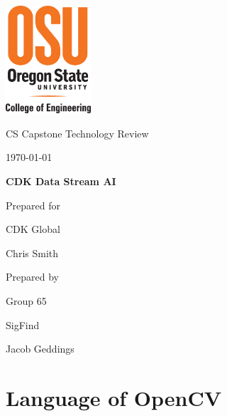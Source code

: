 \documentclass[onecolumn, draftclsnofoot,10pt, compsoc]{IEEEtran}
\def \CapstoneTeamName{		SigFind}
\def \CapstoneTeamNumber{		65}
\def \GroupMemberOne{			Jacob Geddings}
\def \CapstoneProjectName{		CDK Data Stream AI}
\def \CapstoneSponsorCompany{	CDK Global}
\def \CapstoneSponsorPerson{		Chris Smith}
\def \DocType{		%
				Technology Review
				}
\begin{document}
\begin{titlepage}
    \begin{singlespace}
    	\includegraphics[height=4cm]{coe_v_spot1}
        \hfill 
        \par\vspace{.2in}
        \centering
        \scshape{
            \huge CS Capstone \DocType \par
            {\large\today}\par
            \vspace{.5in}
            \textbf{\Huge\CapstoneProjectName}\par
            \vfill
            {\large Prepared for}\par
            \Huge \CapstoneSponsorCompany\par
            \vspace{5pt}
            {\Large\CapstoneSponsorPerson\par}
            {\large Prepared by }\par
            Group\CapstoneTeamNumber\par
            \CapstoneTeamName\par 
            \vspace{5pt}
            {\Large
                \GroupMemberOne\par
            }
            \vspace{20pt}
        }
  
    \end{singlespace}
\end{titlepage}
\newpage
{}
\tableofcontents
\clearpage

\section{Language of OpenCV}
\end{document}
